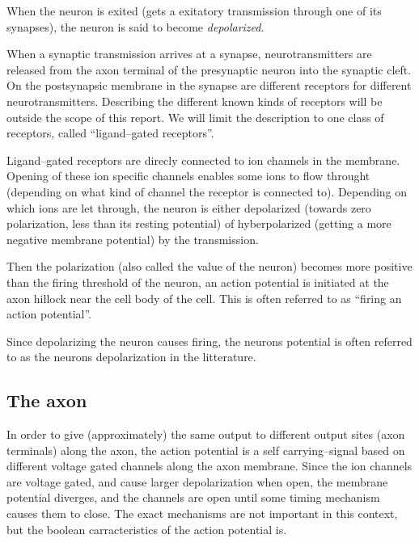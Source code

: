 
When the neuron is exited (gets a exitatory transmission through one of its synapses), the neuron is said to become \emph{depolarized}. 

When a synaptic transmission arrives at a synapse, neurotransmitters are released from the axon terminal of the presynaptic neuron into the synaptic cleft.
On the postsynapsic membrane in the synapse are different receptors for different neurotransmitters\cite{PrinciplesOfNeuralScience4edKAP09}. 
Describing the different known kinds of receptors will be outside the scope of this report. We will limit the description to one class of receptors, called ``ligand--gated receptors''.

Ligand--gated receptors are direcly connected to ion channels in the membrane. Opening of these ion specific channels enables some ions to flow throught (depending on what kind of channel the receptor is connected to). 
Depending on which ions are let through, the neuron is either depolarized (towards zero polarization, less than its resting potential) of hyberpolarized (getting a more negative membrane potential) by the transmission.

Then the polarization (also called the value of the neuron) becomes more positive than the firing threshold of the neuron, an action potential is initiated at the axon hillock near the cell body of the cell. 
This is often referred to as ``firing an action potential''.

Since depolarizing the neuron causes firing, the neurons potential is often referred to as the neurons depolarization in the litterature.



\subsection{The axon}

In order to give (approximately) the same output to different output sites (axon terminals) along the axon, the action potential is a self carrying--signal based on different voltage gated channels along the axon membrane. 
Since the ion channels are voltage gated, and cause larger depolarization when open, the membrane potential diverges, and the channels are open until some timing mechanism causes them to close. 
The exact mechanisms are not important in this context, but the boolean carracteristics of the action potential is. 

